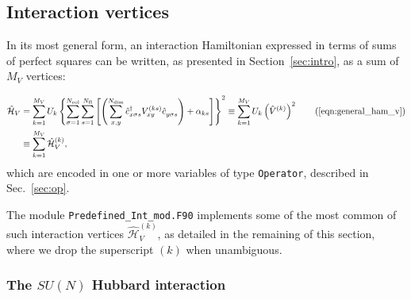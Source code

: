 %
\subsection{Interaction vertices} \label{sec:interaction_vertices}

In its most general form, an interaction Hamiltonian expressed in terms of sums of perfect squares can be written, as presented in Section~\ref{sec:intro}, as a sum of $M_V$ vertices: %

\begin{align*}
\hat{\mathcal{H}}_{V} &=  \sum\limits_{k=1}^{M_V}U_{k}
\left\{ \sum\limits_{\sigma=1}^{N_{\mathrm{col}}}
\sum\limits_{s=1}^{N_{\mathrm{fl}}} \left[ \left(
\sum\limits_{x,y}^{N_{\mathrm{dim}}} \hat{c}^{\dagger}_{x \sigma s}V_{xy}^{(k s)}\hat{c}^{\phantom\dagger}_{y \sigma s}\right)  +\alpha_{k s}  \right] \right\}^{2}
\equiv    \sum\limits_{k=1}^{M_V}U_{k}   \left(\hat{V}^{(k)} \right)^2 \tag{\ref{eqn:general_ham_v}}\\
&\equiv    \sum\limits_{k=1}^{M_V}\hat{\mathcal{H}}_V^{(k)},
\end{align*}
which are encoded in one or more variables of type \texttt{Operator}, described in Sec.~\ref{sec:op}.

The module \texttt{Predefined\_Int\_mod.F90} implements some of the most common of such interaction vertices $\hat{\mathcal{H}}_V^{(k)}$, as detailed in the remaining of this section, where we drop the superscript $(k)$ when unambiguous.


\subsubsection{The $SU(N)$ Hubbard interaction}

